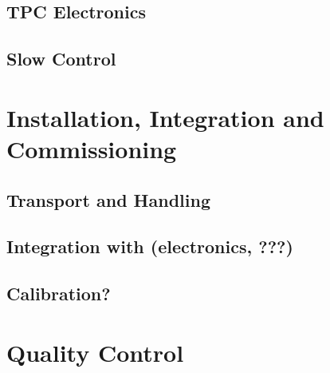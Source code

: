 
\subsection{TPC Electronics}
\label{sec:fddp-daq-intfc-elec}


\subsection{}
\label{sec:fddp-daq-intfc-?}

\subsection{Slow Control}
\label{sec:fdsp-daq-intfc-sc}
\label{sec:fdgen-daq-intfc-sc}


\section{Installation, Integration and Commissioning}
\label{sec:fddp-daq-install}

\subsection{Transport and Handling}
\label{sec:fddp-daq-install-transport}


\subsection{Integration with (electronics, ???)}
\label{sec:fddp-daq-install-pd-???}


\subsection{Calibration?}
\label{sec:fddp-daq-install-calib}



\section{Quality Control}
\label{sec:fddp-daq-qc}

